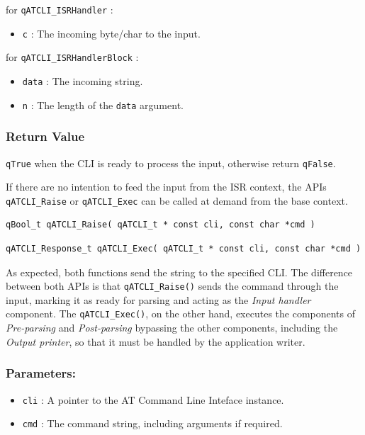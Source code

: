 \documentclass{article}
\begin{document}
for \lstinline{qATCLI_ISRHandler} :
\begin{itemize}
    \item \lstinline{c} : The incoming byte/char to the input. 
\end{itemize}

for \lstinline{qATCLI_ISRHandlerBlock} :
\begin{itemize}
    \item \lstinline{data} : The incoming string.
    \item \lstinline{n} : The length of the \lstinline{data} argument.
\end{itemize}

\subsubsection*{Return Value}
\lstinline{qTrue} when the CLI is ready to process the input, otherwise return \lstinline{qFalse}.

\noindent\hrulefill
\newline
If there are no intention to feed the input from the ISR context, the APIs \lstinline{qATCLI_Raise}  or \lstinline{qATCLI_Exec}  can be called at demand from the base context. \\

\begin{lstlisting}[style=CStyle]
qBool_t qATCLI_Raise( qATCLI_t * const cli, const char *cmd )
\end{lstlisting}

\begin{lstlisting}[style=CStyle]
qATCLI_Response_t qATCLI_Exec( qATCLI_t * const cli, const char *cmd )
\end{lstlisting}

As expected, both functions send the string to the specified CLI.
The difference between both APIs is that \lstinline{qATCLI_Raise()} sends the command through the input, marking it as ready for parsing and acting as the \textit{Input handler} component.
The \lstinline{qATCLI_Exec()}, on the other hand, executes the components of \textit{Pre-parsing} and \textit{Post-parsing} bypassing the other components, including the \textit{Output printer}, so that it must be handled by the application writer.

\subsubsection*{Parameters:}
\begin{itemize}
    \item \lstinline{cli} : A pointer to the AT Command Line Inteface instance.
    \item \lstinline{cmd} : The command string, including arguments if required.
\end{itemize}
\end{document}
